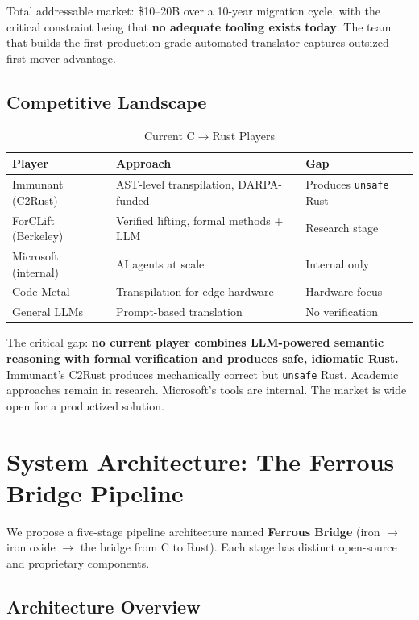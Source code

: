 \documentclass[11pt,a4paper]{article}
\theoremstyle{definition}
\theoremstyle{remark}
\begin{document}
Total addressable market: \$10--20B over a 10-year migration cycle, with the critical constraint being that \textbf{no adequate tooling exists today}. The team that builds the first production-grade automated translator captures outsized first-mover advantage.

\subsection{Competitive Landscape}

\begin{table}[H]
\centering
\caption{Current C$\to$Rust Players}
\begin{tabularx}{\textwidth}{lXl}
\toprule
\textbf{Player} & \textbf{Approach} & \textbf{Gap} \\
\midrule
Immunant (C2Rust) & AST-level transpilation, DARPA-funded & Produces \texttt{unsafe} Rust \\
ForCLift (Berkeley) & Verified lifting, formal methods + LLM & Research stage \\
Microsoft (internal) & AI agents at scale & Internal only \\
Code Metal & Transpilation for edge hardware & Hardware focus \\
General LLMs & Prompt-based translation & No verification \\
\bottomrule
\end{tabularx}
\end{table}

The critical gap: \textbf{no current player combines LLM-powered semantic reasoning with formal verification and produces safe, idiomatic Rust.} Immunant's C2Rust produces mechanically correct but \texttt{unsafe} Rust. Academic approaches remain in research. Microsoft's tools are internal. The market is wide open for a productized solution.


\section{System Architecture: The Ferrous Bridge Pipeline}

We propose a five-stage pipeline architecture named \textbf{Ferrous Bridge} (iron $\to$ iron oxide $\to$ the bridge from C to Rust). Each stage has distinct open-source and proprietary components.

\subsection{Architecture Overview}
\end{document}

